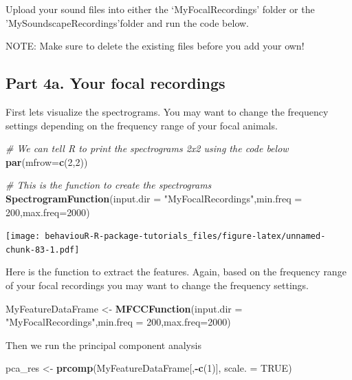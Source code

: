 \documentclass[]{book}
\newenvironment{Shaded}{\begin{snugshade}}{\end{snugshade}}
\newcommand{\CommentTok}[1]{\textcolor[rgb]{0.56,0.35,0.01}{\textit{#1}}}
\newcommand{\DataTypeTok}[1]{\textcolor[rgb]{0.13,0.29,0.53}{#1}}
\newcommand{\DecValTok}[1]{\textcolor[rgb]{0.00,0.00,0.81}{#1}}
\newcommand{\KeywordTok}[1]{\textcolor[rgb]{0.13,0.29,0.53}{\textbf{#1}}}
\newcommand{\NormalTok}[1]{#1}
\newcommand{\OperatorTok}[1]{\textcolor[rgb]{0.81,0.36,0.00}{\textbf{#1}}}
\newcommand{\OtherTok}[1]{\textcolor[rgb]{0.56,0.35,0.01}{#1}}
\newcommand{\StringTok}[1]{\textcolor[rgb]{0.31,0.60,0.02}{#1}}
\begin{document}
Upload your sound files into either the `MyFocalRecordings' folder or the 'MySoundscapeRecordings'folder and run the code below.

NOTE: Make sure to delete the existing files before you add your own!

\hypertarget{part-4a.-your-focal-recordings}{%
\subsection{Part 4a. Your focal recordings}\label{part-4a.-your-focal-recordings}}

First lets visualize the spectrograms. You may want to change the frequency settings depending on the frequency range of your focal animals.

\begin{Shaded}
\begin{Highlighting}[]
\CommentTok{# We can tell R to print the spectrograms 2x2 using the code below}
\KeywordTok{par}\NormalTok{(}\DataTypeTok{mfrow=}\KeywordTok{c}\NormalTok{(}\DecValTok{2}\NormalTok{,}\DecValTok{2}\NormalTok{))}

\CommentTok{# This is the function to create the spectrograms}
\KeywordTok{SpectrogramFunction}\NormalTok{(}\DataTypeTok{input.dir =} \StringTok{"MyFocalRecordings"}\NormalTok{,}\DataTypeTok{min.freq =} \DecValTok{200}\NormalTok{,}\DataTypeTok{max.freq=}\DecValTok{2000}\NormalTok{)}
\end{Highlighting}
\end{Shaded}

\texttt{[image: behaviouR-R-package-tutorials\_files/figure-latex/unnamed-chunk-83-1.pdf]}

Here is the function to extract the features. Again, based on the frequency range of your focal recordings you may want to change the frequency settings.

\begin{Shaded}
\begin{Highlighting}[]
\NormalTok{MyFeatureDataFrame <-}\StringTok{ }\KeywordTok{MFCCFunction}\NormalTok{(}\DataTypeTok{input.dir =} \StringTok{"MyFocalRecordings"}\NormalTok{,}\DataTypeTok{min.freq =} \DecValTok{200}\NormalTok{,}\DataTypeTok{max.freq=}\DecValTok{2000}\NormalTok{)}
\end{Highlighting}
\end{Shaded}

Then we run the principal component analysis

\begin{Shaded}
\begin{Highlighting}[]
\NormalTok{pca_res <-}\StringTok{ }\KeywordTok{prcomp}\NormalTok{(MyFeatureDataFrame[,}\OperatorTok{-}\KeywordTok{c}\NormalTok{(}\DecValTok{1}\NormalTok{)], }\DataTypeTok{scale. =} \OtherTok{TRUE}\NormalTok{)}
\end{Highlighting}
\end{Shaded}
\end{document}

